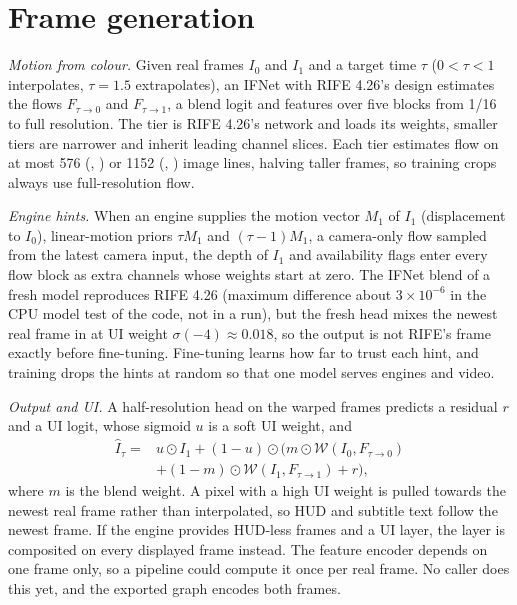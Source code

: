 \documentclass[pdflatex,sn-mathphys-num,iicol]{sn-jnl}
\begin{document}
\section{Frame generation}\label{sec:fg}

\emph{Motion from colour.} Given real frames $I_0$ and $I_1$ and a target time $\tau$ ($0<\tau<1$ interpolates, $\tau=1.5$ extrapolates), an IFNet with RIFE 4.26's design estimates the flows $F_{\tau\to0}$ and $F_{\tau\to1}$, a blend logit and features over five blocks from 1/16 to full resolution. The  tier is RIFE 4.26's network and loads its weights, smaller tiers are narrower and inherit leading channel slices. Each tier estimates flow on at most 576 (, ) or 1152 (, ) image lines, halving taller frames, so training crops always use full-resolution flow.

\emph{Engine hints.} When an engine supplies the motion vector $M_1$ of $I_1$ (displacement to $I_0$), linear-motion priors $\tau M_1$ and $(\tau-1) M_1$, a camera-only flow sampled from the latest camera input, the depth of $I_1$ and availability flags enter every flow block as extra channels whose weights start at zero. The IFNet blend of a fresh  model reproduces RIFE 4.26 (maximum difference about $3\times10^{-6}$ in the CPU model test of the code, not in a run), but the fresh head mixes the newest real frame in at UI weight $\sigma(-4)\approx0.018$, so the output is not RIFE's frame exactly before fine-tuning. Fine-tuning learns how far to trust each hint, and training drops the hints at random so that one model serves engines and video.

\emph{Output and UI.} A half-resolution head on the warped frames predicts a residual $r$ and a UI logit, whose sigmoid $u$ is a soft UI weight, and
\begin{align}
\hat{I}_\tau ={}& u \odot I_1 + (1-u)\odot\big(m\odot\mathcal{W}(I_0,F_{\tau\to0}) \nonumber\\
&+ (1-m)\odot\mathcal{W}(I_1,F_{\tau\to1}) + r\big),\label{eq:fg}
\end{align}
where $m$ is the blend weight. A pixel with a high UI weight is pulled towards the newest real frame rather than interpolated, so HUD and subtitle text follow the newest frame. If the engine provides HUD-less frames and a UI layer, the layer is composited on every displayed frame instead. The feature encoder depends on one frame only, so a pipeline could compute it once per real frame. No caller does this yet, and the exported graph encodes both frames.
\end{document}
